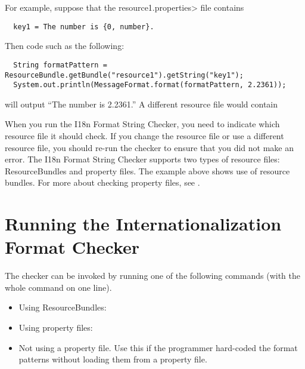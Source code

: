 \noindent For example, suppose that the \<resource1.properties> file contains

\begin{Verbatim}
  key1 = The number is {0, number}.
\end{Verbatim}

\noindent Then code such as the following:

\begin{Verbatim}
  String formatPattern = ResourceBundle.getBundle("resource1").getString("key1");
  System.out.println(MessageFormat.format(formatPattern, 2.2361));
\end{Verbatim}

\noindent will output ``The number is 2.2361.''  A different resource file would contain

When you run the I18n Format String Checker, you need to indicate which resource file it
should check. If you change the resource file or use a different resource
file, you should re-run the checker
to ensure that you did not make an error. The I18n Format String Checker supports two types of
resource files: ResourceBundles and property files. The example above shows use of
resource bundles.
For more about checking property files, see .


\section{Running the Internationalization Format Checker\label{i18n-format-running}}

The checker can be invoked by running one of the following commands (with
the whole command on one line).

\begin{itemize}
  \item Using ResourceBundles:

    \begin{smaller}
    \end{smaller}

  \item Using property files:

    \begin{smaller}
    \end{smaller}

  \item Not using a property file.  Use this if the programmer hard-coded the
  format patterns without loading them from a property file.

\end{itemize}


